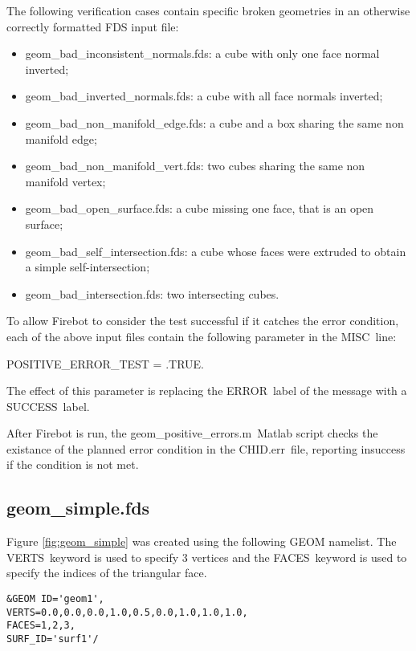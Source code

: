 \documentclass[12pt]{article}
\begin{document}
The following verification cases contain specific broken geometries in an otherwise correctly
formatted FDS input file:

\begin{itemize}
  \item {\ct geom\_bad\_inconsistent\_normals.fds}: a cube with only one face normal inverted;
  \item {\ct geom\_bad\_inverted\_normals.fds}: a cube with all face normals inverted;
  \item {\ct geom\_bad\_non\_manifold\_edge.fds}: a cube and a box sharing the same non manifold edge;
  \item {\ct geom\_bad\_non\_manifold\_vert.fds}: two cubes sharing the same non manifold vertex; %
  \item {\ct geom\_bad\_open\_surface.fds}: a cube missing one face, that is an open surface;
  \item {\ct geom\_bad\_self\_intersection.fds}: a cube whose faces were extruded to obtain a simple self-intersection;
  \item {\ct geom\_bad\_intersection.fds}: two intersecting cubes. %
\end{itemize}

To allow Firebot to consider the test successful if it catches the error condition,
each of the above input files contain the following parameter in the {\ct MISC}\ line:

{\ct POSITIVE\_ERROR\_TEST = .TRUE.}\

The effect of this parameter is replacing the {\ct ERROR}\ label of the message with a {\ct SUCCESS}\ label.

After Firebot is run, the {\ct geom\_positive\_errors.m}\ Matlab script checks the existance
of the planned error condition in the {\ct CHID.err}\ file, reporting insuccess if the condition
is not met.

\subsection{geom\_simple.fds}
Figure \ref{fig:geom_simple} was created using the following GEOM namelist.
The {\ct VERTS}\ keyword is used to specify 3 vertices and the {\ct FACES}\ keyword
is used to specify the indices of the triangular face.

{\small
\begin{verbatim}
&GEOM ID='geom1',
VERTS=0.0,0.0,0.0,1.0,0.5,0.0,1.0,1.0,1.0,
FACES=1,2,3,
SURF_ID='surf1'/
\end{verbatim}
}
\end{document}
